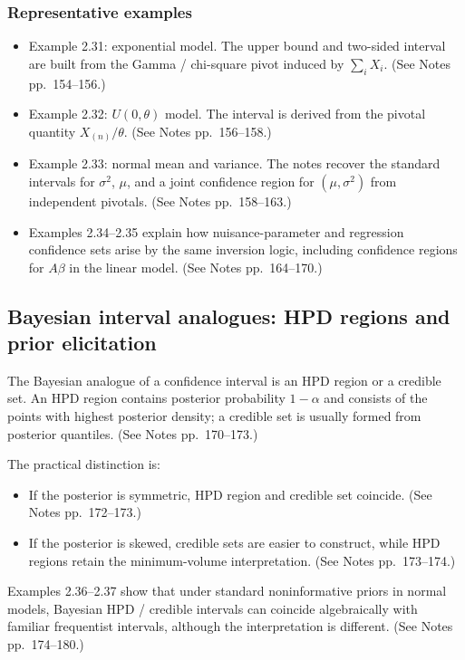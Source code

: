 \subsubsection{Representative examples}
\begin{itemize}
    \item Example 2.31: exponential model. The upper bound and two-sided interval are built from the Gamma / chi-square pivot induced by $\sum_i X_i$. (See Notes pp.~154--156.)
    \item Example 2.32: $U(0,\theta)$ model. The interval is derived from the pivotal quantity $X_{(n)}/\theta$. (See Notes pp.~156--158.)
    \item Example 2.33: normal mean and variance. The notes recover the standard intervals for $\sigma^2$, $\mu$, and a joint confidence region for $(\mu,\sigma^2)$ from independent pivotals. (See Notes pp.~158--163.)
    \item Examples 2.34--2.35 explain how nuisance-parameter and regression confidence sets arise by the same inversion logic, including confidence regions for $A\beta$ in the linear model. (See Notes pp.~164--170.)
\end{itemize}

\subsection{Bayesian interval analogues: HPD regions and prior elicitation}
The Bayesian analogue of a confidence interval is an HPD region or a credible set. An HPD region contains posterior probability $1-\alpha$ and consists of the points with highest posterior density; a credible set is usually formed from posterior quantiles. (See Notes pp.~170--173.)

The practical distinction is:
\begin{itemize}
    \item If the posterior is symmetric, HPD region and credible set coincide. (See Notes pp.~172--173.)
    \item If the posterior is skewed, credible sets are easier to construct, while HPD regions retain the minimum-volume interpretation. (See Notes pp.~173--174.)
\end{itemize}

Examples 2.36--2.37 show that under standard noninformative priors in normal models, Bayesian HPD / credible intervals can coincide algebraically with familiar frequentist intervals, although the interpretation is different. (See Notes pp.~174--180.)


